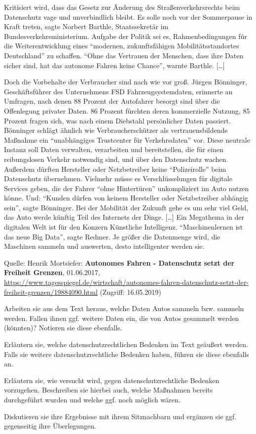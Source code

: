 \documentclass[9pt, a4paper, twocolumn, landscape]{scrartcl}
\begin{document}
\begin{zeilenNr}
Kritisiert wird, dass das Gesetz zur Änderung des Straßenverkehrsrechts beim Datenschutz vage und unverbindlich bleibt. Es solle noch vor der Sommerpause in Kraft treten, sagte Norbert Barthle, Staatssekretär im Bundesverkehrsministerium. Aufgabe der Politik sei es, Rahmenbedingungen für die Weiterentwicklung eines \enquote{modernen, zukunftsfähigen Mobilitätsstandortes Deutschland} zu schaffen. \enquote{Ohne das Vertrauen der Menschen, dass ihre Daten sicher sind, hat das autonome Fahren keine Chance}, warnte Barthle. [\dots]

Doch die Vorbehalte der Verbraucher sind nach wie vor groß. Jürgen Bönninger, Geschäftsführer des Unternehmens FSD Fahrzeugsystemdaten, erinnerte an Umfragen, nach denen 88 Prozent der Autofahrer besorgt sind über die Offenlegung privater Daten. 86 Prozent fürchten deren kommerzielle Nutzung, 85 Prozent fragen sich, was nach einem Diebstahl persönlicher Daten passiert. Bönninger schlägt ähnlich wie Verbraucherschützer als vertrauensbildende Maßnahme ein \enquote{unabhängiges Trustcenter für Verkehrsdaten} vor. Diese neutrale Instanz soll Daten verwalten, verarbeiten und bereitstellen, die für einen reibungslosen Verkehr notwendig sind, und über den Datenschutz wachen. Außerdem dürften Hersteller oder Netzbetreiber keine \enquote{Polizeirolle} beim Datenschutz übernehmen. Vielmehr müsse es Verschlüsselungen für digitale Services geben, die der Fahrer \enquote{ohne Hintertüren} unkompliziert im Auto nutzen könne. Und: \enquote{Kunden dürfen von keinem Hersteller oder Netzbetreiber abhängig sein}, sagte Bönninger. Bei der Mobilität der Zukunft gehe es um sehr viel Geld, das Auto werde künftig Teil des Internets der Dinge. [\dots] Ein Megathema in der digitalen Welt ist für den Konzern Künstliche Intelligenz. \enquote{Maschinenlernen ist das neue Big Data}, sagte Redmer. Je größer die Datenmenge wird, die Maschinen sammeln und auswerten, desto intelligenter werden sie.
\end{zeilenNr}

\medskip
\small Quelle: Henrik Mortsiefer: \textbf{Autonomes Fahren - Datenschutz setzt der Freiheit Grenzen}, 01.06.2017,  \url{https://www.tagesspiegel.de/wirtschaft/autonomes-fahren-datenschutz-setzt-der-freiheit-grenzen/19884090.html} (Zugriff: 16.05.2019)

\begin{enumeraten}
	\item Arbeiten sie aus dem Text heraus, welche Daten Autos sammeln bzw. sammeln werden. Fallen ihnen ggf. weitere Daten ein, die von Autos gesammelt werden (könnten)? Notieren sie diese ebenfalls.
	\item Erläutern sie, welche datenschutzrechtlichen Bedenken im Text geäußert werden. Falls sie weitere datenschutzrechtliche Bedenken haben, führen sie diese ebenfalls an.
	\item Erläutern sie, wie versucht wird, gegen datenschutzrechtliche Bedenken vorzugehen. Beschreiben sie hierbei auch, welche Maßnahmen bereits durchgeführt wurden und welche ggf. noch möglich wären.
	\item Diskutieren sie ihre Ergebnisse mit ihrem Sitznachbarn und ergänzen sie ggf. gegenseitig ihre Überlegungen.
\end{enumeraten}
\end{document}
